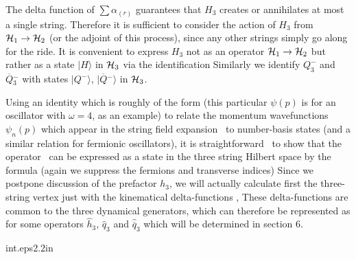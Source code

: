The delta function of $\sum \alpha_{(r)}$ guarantees that
$H_3$ creates or annihilates at most a single string.
Therefore it is sufficient to consider the action of $H_3$
from
${\cal{H}}_1 \to {\cal{H}}_2$ (or the adjoint of this process),
since any other strings
simply go along for the ride.
It is convenient to express $H_3$
not as an operator ${\cal{H}}_1 \to {\cal{H}}_2$
but rather as a state $|H\rangle$ in ${\cal{H}}_3$ via the
identification
\eqn{}
Similarly we identify $Q_3^-$ and $\overline{Q}{}_3^-$ with states
$|Q^-\rangle$, $|\overline{Q}{}^-\rangle$ in ${\cal{H}}_3$.

Using an identity which is roughly of the form
\eqn{}
(this particular $\psi(p)$ is for an oscillator with $\omega=4$,
as an example)
to relate the momentum wavefunctions
$\psi_n(p)$
which appear in the string field expansion \sfield\ 
to number-basis states (and a similar
relation for fermionic oscillators), it is straightforward
\GreenTC\ to show that the
operator \hthreeint\ can be expressed as a state
in the three string Hilbert space
by the formula
(again we suppress the fermions and transverse indices)
\eqn{}
Since we postpone discussion of the prefactor $h_3$, we will actually
calculate first the three-string vertex
just with the kinematical delta-functions \measure,
\eqn{}
These delta-functions are common to the three dynamical
generators, which can therefore be represented as
\eqn{}
for some operators $\hat{h}_3$, $\hat{q}_3$ and $\hat{\overline{q}}_3$
which will be determined in section 6.


{int.eps}{2.2in}

